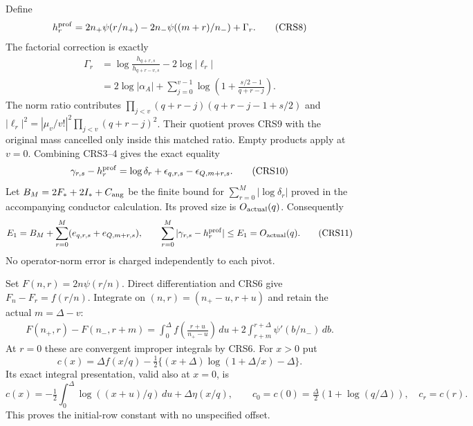 \documentclass[11pt,a4paper]{article}
\begin{document}
Define
\[
 h_r^{\rm prof}=2n_+\psi(r/n_+)-2n_-\psi((m+r)/n_-)+\Gamma_r.
                                                               \tag{CRS8}
\]
The factorial correction is exactly
\[
\begin{split}
 \Gamma_r&=\log\frac{h_{q+r,s}}{h_{q+r-v,s}}-2\log|\ell_r|\\
 &=2\log|\alpha_A|+
   \sum_{j=0}^{v-1}\log\left(1+\frac{s/2-1}{q+r-j}\right).
\end{split}                                                    \tag{CRS9}
\]
The norm ratio contributes
$\prod_{j<v}(q+r-j)(q+r-j-1+s/2)$ and
$|\ell_r|^2=|\mu_v/v!|^2\prod_{j<v}(q+r-j)^2$.
Their quotient proves CRS9 with the original mass cancelled only
inside this matched ratio. Empty products apply at $v=0$.
Combining CRS3--4 gives the exact equality
\[
 \gamma_{r,s}-h_r^{\rm prof}
   =\log\delta_r+\epsilon_{q,r,s}-\epsilon_{Q,m+r,s}.  \tag{CRS10}
\]
Let $B_M=2F_*+2I_*+C_{\rm ang}$ be the finite bound for
$\sum_{r=0}^M|\log\delta_r|$ proved in the accompanying conductor
calculation. Its proved size is $O_{\rm actual}(q)$.
Consequently
\[
 E_1=B_M+\sum_{r=0}^M(e_{q,r,s}+e_{Q,m+r,s}),\qquad
 \sum_{r=0}^M|\gamma_{r,s}-h_r^{\rm prof}|
 \le E_1=O_{\rm actual}(q).                           \tag{CRS11}
\]
No operator-norm error is charged independently to each pivot.

Set $F(n,r)=2n\psi(r/n)$. Direct differentiation and CRS6 give
$F_n-F_r=f(r/n)$. Integrate on $(n,r)=(n_+-u,r+u)$ and retain
the actual $m=\Delta-v$:
\[
\begin{split}
 F(n_+,r)-F(n_-,r+m)
 =\int_0^\Delta f\left(\frac{r+u}{n_+-u}\right)\,du
       +2\int_{r+m}^{r+\Delta}\psi'(b/n_-)\,db .
\end{split}                                                    \tag{CRS12}
\]
At $r=0$ these are convergent improper integrals by CRS6.
For $x>0$ put
\[
 c(x)=\Delta f(x/q)
 -\tfrac12\{(x+\Delta)\log(1+\Delta/x)-\Delta\}.        \tag{CRS13}
\]
Its exact integral presentation, valid also at $x=0$, is
\[
 c(x)=-\tfrac12\int_0^\Delta\log((x+u)/q)\,du
                     +\Delta\eta(x/q),\qquad
 c_0=c(0)=\tfrac{\Delta}{2}(1+\log(q/\Delta)),\quad c_r=c(r).
                                                               \tag{CRS14}
\]
This proves the initial-row constant with no unspecified offset.
\end{document}
